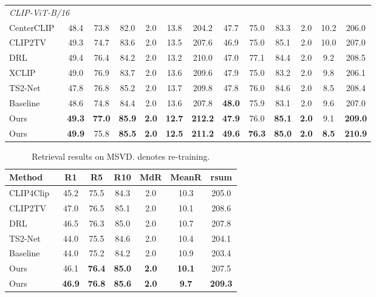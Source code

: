 \documentclass[sigconf]{acmart}
\begin{document}
\begin{table*}[]
{\begin{tabular}{l| c c c c c c| c c c c c c}
\midrule
        \multicolumn{12}{l}{\textit{CLIP-ViT-B/16}} \\  
         {CenterCLIP~\cite{centerclip2022}} & 48.4	& 73.8	& 82.0	& 2.0	& 13.8	& 204.2	& 47.7	& 75.0	& 83.3	& 2.0	& 10.2	& 206.0  \\
         {CLIP2TV~\cite{clip2tv2021}} &49.3	&74.7	&83.6	&2.0	&13.5	&207.6	&46.9	&75.0	&85.1	&2.0	&10.0	&207.0  \\
{DRL~\cite{drl2022}} &49.4& 76.4& 84.2& 2.0& 13.2& 210.0 &47.0& 77.1& 84.4& 2.0& 9.2& 208.5 \\
{XCLIP~\cite{xclip2022}} &49.0& 76.9& 83.7& 2.0& 13.6& 209.6 &47.9& 75.0& 83.2& 2.0& 9.8& 206.1\\
{TS2-Net~\cite{ts2net2022}} &47.8& 76.8& 85.2& 2.0& 13.7& 209.8 & 47.8	& 76.0	& 84.6	& 2.0	& 8.5	& 208.4\\
       {Baseline} &48.6 &74.8	&84.4	&2.0 &13.6	&207.8	&\textbf{48.0}	&75.9	&83.1	&2.0	&9.6 &207.0 \\ 
       {Ours} &  \textbf{49.3}  &\textbf{77.0}  &\textbf{85.9}  &\textbf{2.0}	 &\textbf{12.7}	 &\textbf{212.2}  &\textbf{47.9}	 &76.0	 &\textbf{85.1}	 &\textbf{2.0}	 &9.1	 &\textbf{209.0} \\ 
{Ours} & \textbf{49.9}& 75.8& \textbf{85.5}& \textbf{2.0} & \textbf{12.5}& \textbf{211.2} &\textbf{49.6}& \textbf{76.3}& \textbf{85.0}&\textbf{2.0}& \textbf{8.5}& \textbf{210.9} \\ \bottomrule
     \end{tabular} }
\end{table*}

\begin{table}[]
\centering
    \caption{Retrieval results on MSVD.  denotes re-training.}\label{tab:res_msvd}
    \renewcommand{\arraystretch}{0.8}\setlength\tabcolsep{2pt}\begin{tabular}{l| c c c c c c}
        \toprule
         {Method} & {R1} & {R5} & {R10} & {MdR} & {MeanR} & {rsum} \\ \toprule
        {CLIP4Clip~\cite{clip4clip2021}} & 45.2	&75.5	&84.3	&2.0	&10.3	&205.0 \\ 
        {CLIP2TV~\cite{clip2tv2021}} & 47.0	&76.5	&85.1	&2.0	&10.1	&208.6 \\ 
{DRL~\cite{drl2022}} & 46.5&  76.3&  85.0&  2.0& 10.7& 207.8 \\ 
{TS2-Net~\cite{ts2net2022}} & 44.0	&75.5	&84.6	&2.0	&10.4	&204.1 \\
{Baseline} & 44.0	&75.2	&84.2	&2.0	&10.9	&203.4 \\
{Ours} & 46.1 	& \textbf{76.4} & 	\textbf{85.0} & 	\textbf{2.0} & 	\textbf{10.1} & 207.5 \\

{Ours} & \textbf{46.9}&  \textbf{76.8}&  \textbf{85.6}&  \textbf{2.0}&  \textbf{9.7}&  \textbf{209.3} \\ \bottomrule
    \end{tabular}
\end{table}
\end{document}
